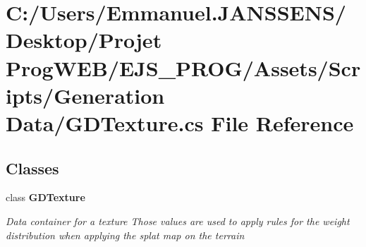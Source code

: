 \section{C\+:/\+Users/\+Emmanuel.J\+A\+N\+S\+S\+E\+N\+S/\+Desktop/\+Projet Prog\+W\+E\+B/\+E\+J\+S\+\_\+\+P\+R\+O\+G/\+Assets/\+Scripts/\+Generation Data/\+G\+D\+Texture.cs File Reference}
\label{_g_d_texture_8cs}
\subsection*{Classes}
\begin{DoxyCompactItemize}
\item 
class \textbf{ G\+D\+Texture}
\begin{DoxyCompactList}\small\item\em Data container for a texture Those values are used to apply rules for the weight distribution when applying the splat map on the terrain \end{DoxyCompactList}\end{DoxyCompactItemize}
